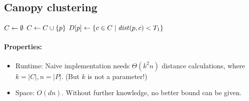 \subsection{Canopy clustering}

\textcite{MNU00a}

\begin{algorithm}
\begin{algorithmic}[1]
	\State $C \leftarrow \emptyset$
			\State $C \leftarrow C \cup \{ p \}$
		\EndIf
	\EndFor
		\State $D[p] \leftarrow \{ c \in C \mid \mathit{dist}(p, c) < T_1 \}$
	\EndFor
\end{algorithmic}
\end{algorithm}

\paragraph{Properties:}
\begin{itemize}
	\item Runtime: Naive implementation needs $\Theta(k^2 n)$ distance calculations, where $k = |C|, n = |P|$. (But $k$ is not a parameter!)
	\item Space: $O(dn)$. Without further knowledge, no better bound can be given.
\end{itemize}
